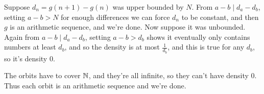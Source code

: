 \documentclass[11pt,paper=letter]{scrartcl}
\begin{document}
\begin{enumerate}
Suppose $d_n = g(n + 1) - g(n)$ was upper bounded by $N$. From $a - b \mid d_a - d_b$, setting $a - b > N$ for enough differences we can force $d_n$ to be constant, and then $g$ is an arithmetic sequence, and we're done. Now suppose it was unbounded. Again from $a - b \mid d_a - d_b$, setting $a - b > d_b$ shows it eventually only contains numbers at least $d_b$, and so the density is at most $ \frac{1}{d_b} $, and this is true for any $d_b$, so it's density $0$.

The orbits have to cover $\mathbb N$, and they're all infinite, so they can't have density $0$. Thus each orbit is an arithmetic sequence and we're done.
\end{enumerate}
\end{document}
